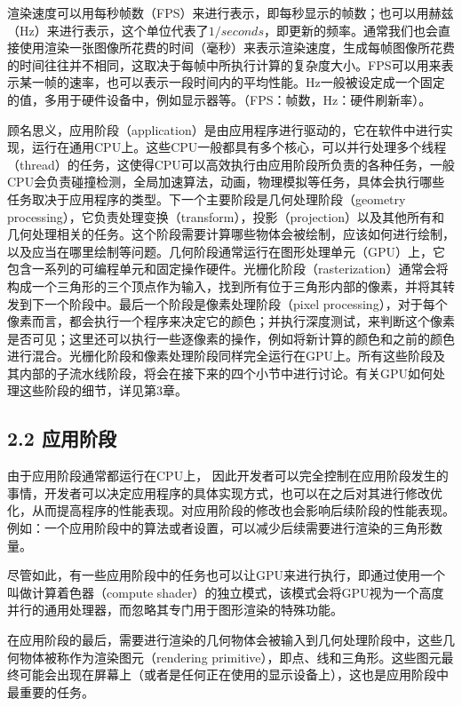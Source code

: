 \documentclass[
  paper=a4,
  ,captions=tableheading
]{scrartcl}
\begin{document}
渲染速度可以用每秒帧数（FPS）来进行表示，即每秒显示的帧数；也可以用赫兹（Hz）来进行表示，这个单位代表了\(1/seconds\)，即更新的频率。通常我们也会直接使用渲染一张图像所花费的时间（毫秒）来表示渲染速度，生成每帧图像所花费的时间往往并不相同，这取决于每帧中所执行计算的复杂度大小。FPS可以用来表示某一帧的速率，也可以表示一段时间内的平均性能。Hz一般被设定成一个固定的值，多用于硬件设备中，例如显示器等。（FPS：帧数，Hz：硬件刷新率）。

顾名思义，应用阶段（application）是由应用程序进行驱动的，它在软件中进行实现，运行在通用CPU上。这些CPU一般都具有多个核心，可以并行处理多个线程（thread）的任务，这使得CPU可以高效执行由应用阶段所负责的各种任务，一般CPU会负责碰撞检测，全局加速算法，动画，物理模拟等任务，具体会执行哪些任务取决于应用程序的类型。下一个主要阶段是几何处理阶段（geometry
processing），它负责处理变换（transform），投影（projection）以及其他所有和几何处理相关的任务。这个阶段需要计算哪些物体会被绘制，应该如何进行绘制，以及应当在哪里绘制等问题。几何阶段通常运行在图形处理单元（GPU）上，它包含一系列的可编程单元和固定操作硬件。光栅化阶段（rasterization）通常会将构成一个三角形的三个顶点作为输入，找到所有位于三角形内部的像素，并将其转发到下一个阶段中。最后一个阶段是像素处理阶段（pixel
processing），对于每个像素而言，都会执行一个程序来决定它的颜色；并执行深度测试，来判断这个像素是否可见；这里还可以执行一些逐像素的操作，例如将新计算的颜色和之前的颜色进行混合。光栅化阶段和像素处理阶段同样完全运行在GPU上。所有这些阶段及其内部的子流水线阶段，将会在接下来的四个小节中进行讨论。有关GPU如何处理这些阶段的细节，详见第3章。

\subsection{2.2 应用阶段}\label{ux5e94ux7528ux9636ux6bb5}

由于应用阶段通常都运行在CPU上，
因此开发者可以完全控制在应用阶段发生的事情，开发者可以决定应用程序的具体实现方式，也可以在之后对其进行修改优化，从而提高程序的性能表现。对应用阶段的修改也会影响后续阶段的性能表现。例如：一个应用阶段中的算法或者设置，可以减少后续需要进行渲染的三角形数量。

尽管如此，有一些应用阶段中的任务也可以让GPU来进行执行，即通过使用一个叫做计算着色器（compute
shader）的独立模式，该模式会将GPU视为一个高度并行的通用处理器，而忽略其专门用于图形渲染的特殊功能。

在应用阶段的最后，需要进行渲染的几何物体会被输入到几何处理阶段中，这些几何物体被称作为渲染图元（rendering
primitive），即点、线和三角形。这些图元最终可能会出现在屏幕上（或者是任何正在使用的显示设备上），这也是应用阶段中最重要的任务。
\end{document}
